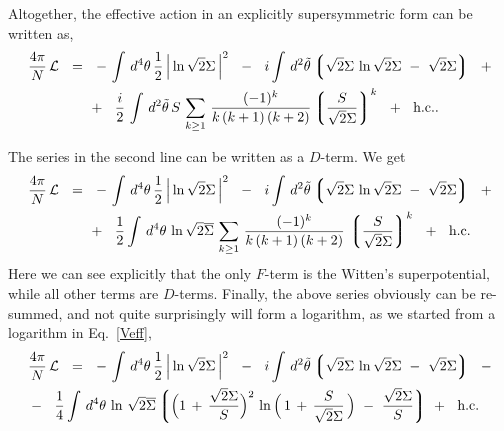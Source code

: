 \documentclass[epsfig,12pt]{article}
\newcommand{\cell}{{\mathcal L}}
\newcommand{\ov}{\overline}
\newcommand{\lgr}{\left\lgroup}
\newcommand{\rgr}{\right\rgroup}
\begin{document}
	Altogether, the effective action in an explicitly supersymmetric form can be written as,
\begin{align}
%
\notag
	\frac{4\pi}{N}\,\cell &    ~~=~~
			-\,
			\int\, d^4\theta\, \frac{1}{2}\, \Big| \ln \sqrt{2}\Sigma \, \Big|^2
			~~-~~
			i \int\, d^2\tilde\theta 
			\lgr
			\sqrt{2}\Sigma\, \ln \sqrt{2}\Sigma  ~-~ \sqrt{2}\Sigma
			\rgr
			~~+
	\\
%
\label{sseries}
	&
			\phantom{~~=~~}
			+~~
			\frac{i}{2}\, 
			\int\, d^2\tilde\theta\,
			S\,
			\sum_{k \geq 1}\, \frac{    (-1)^k    }
                                           {  k\,(k + 1)\,(k + 2)  } \lgr \frac{S}{\sqrt{2}\Sigma} \rgr^k
			~~+~~ \text{h.c.}.
\end{align}

	The series in the second line can be written as a $ D $-term.
	We get
\begin{align}
%
\notag
	\frac{4\pi}{N}\, \cell &    ~~=~~     
			-\,
			\int\, d^4\theta\, \frac{1}{2}\, \Big| \ln \sqrt{2}\Sigma \, \Big|^2
			~~-~~
			i \int\, d^2\tilde\theta 
			\lgr
			\sqrt{2}\Sigma\, \ln \sqrt{2}\Sigma  ~-~ \sqrt{2}\Sigma
			\rgr
			~~+
	\\
%
	&
			\phantom{~~=~~}
			+~~ 
			\frac{1}{2} \int\, d^4\theta\,
			\ln \sqrt{2}\ov\Sigma\,
			\sum_{k \geq 1}\, \frac{    (-1)^k    }
                                           {  k\,(k + 1)\,(k + 2)  }\, \lgr \frac{S}{\sqrt{2}\Sigma} \rgr^k
	~~+~~ \text{h.c.}
\end{align}
	Here we can see explicitly that the only $ F $-term is the Witten's superpotential,
	while all other terms are $ D $-terms.
	Finally, the above series obviously can be re-summed, 
	and not quite surprisingly will form a logarithm,
	as we started from a logarithm in Eq.~\eqref{Veff},
\begin{align}
%
\notag
	&
	\frac{4\pi}{N}\, \cell    ~~=~~     
			-\,
			\int\, d^4\theta\, \frac{1}{2}\, \Big| \ln \sqrt{2}\Sigma \, \Big|^2
			~~-~~
			i \int\, d^2\tilde\theta 
			\lgr
			\sqrt{2}\Sigma\, \ln \sqrt{2}\Sigma  ~-~ \sqrt{2}\Sigma
			\rgr
			~~-
	\\
%
\label{Lsuper}
			&
			-~~ 
			\frac{1}{4} \int\, d^4\theta\,
			\ln\, \sqrt{2}\ov\Sigma
			\lgr \Big( 1 \,+\, \frac{\sqrt{2}\Sigma}{S} \Big)^2\,
				\ln \Big(\, 1 \,+\, \frac{S}{\sqrt{2}\Sigma} \,\Big) ~-~
				\frac{\sqrt{2}\Sigma}{S} \rgr\!\!
			~~+~~ \text{h.c.}
\end{align}
\end{document}
